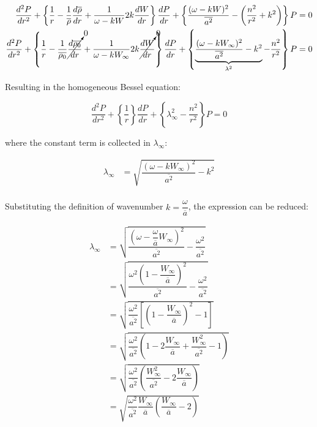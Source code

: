\documentclass[]{aiaa-tc}%
\begin{document}
\begin{align*}
\dfrac{d^2P}{dr^2}
+ \left\{
    \dfrac{1}{r}
    - \dfrac{1}{\overline{\rho}}\frac{d \overline{\rho}}{dr}
    + \dfrac{1}{\omega - kW} 2k \dfrac{dW}{dr}
\right\} \dfrac{dP}{dr}
+ \left\{
    \dfrac{(\omega - kW)^2}{\overline{a^2}}
    - \left( \dfrac{n^2}{r^2} + k^2 \right)
\right\} P = 0 \\
\dfrac{d^2P}{dr^2}
  + \left\{
    \dfrac{1}{r}
    - \dfrac{1}{\overline{\rho_0}} \cancelto{0}{\frac{d \overline{\rho_0}}{dr}}
    + \dfrac{1}{\omega - kW_{\infty}} 2k \cancelto{0}{\dfrac{dW}{dr}}
\right\} \dfrac{dP}{dr}
 + \left\{
    \underbrace{ \dfrac{(\omega - k W_{\infty} )^2}{\overline{a^2} }
    - k^2 }_{\lambda^2}
    - \dfrac{n^2}{r^2}
\right\} P = 0      \\
\end{align*}

Resulting in the homogeneous Bessel equation:

\begin{equation} \label{BesselEqn}
\boxed{ \dfrac{d^2P}{dr^2} + \left\{ \dfrac{1}{r} \right\} \dfrac{dP}{dr}
      + \left\{ \lambda_{\infty}^2 - \dfrac{n^2}{r^2} \right\} P = 0 }
\end{equation}

\noindent where the constant term is collected in $\lambda_{\infty}$:

\begin{align*}
\lambda_{\infty} &= \sqrt{\dfrac{(\omega - k W_{\infty} )^2}{\overline{a^2} } - k^2} \\
\end{align*}

Substituting the definition of wavenumber $k=\dfrac{\omega}{\overline{a}}$, the expression can be reduced:

\begin{align*}
\lambda_{\infty} &= \sqrt{
  \dfrac{ \left(\omega -\dfrac{\omega}{\overline{a}} W_{\infty} \right)^2}{\overline{a^2}}
  - \dfrac{\omega^2}{\overline{a^2}}
  } \\
&= \sqrt{
  \dfrac{ \omega^2 \left(1 -\dfrac{W_{\infty}}{\overline{a}} \right)^2}{\overline{a^2}}
  - \dfrac{\omega^2}{\overline{a^2}}
  } \\
&= \sqrt{ \dfrac{\omega^2}{\overline{a^2}}
    \left[ \left(1 -\dfrac{W_{\infty}}{\overline{a}} \right)^2 - 1  \right]
  } \\
&= \sqrt{ \dfrac{\omega^2}{\overline{a^2}}
    \left( 1 -2\dfrac{W_{\infty}}{\overline{a}} + \dfrac{W_{\infty}^2}{\overline{a^2}} - 1  \right) } \\
&= \sqrt{ \dfrac{\omega^2}{\overline{a^2}}
    \left( \dfrac{W_{\infty}^2}{\overline{a^2}} -2\dfrac{W_{\infty}}{\overline{a}} \right) } \\
&= \sqrt{ \dfrac{\omega^2}{\overline{a^2}} \dfrac{W_{\infty}}{\overline{a}}
    \left( \dfrac{W_{\infty}}{\overline{a}} - 2 \right) } \\
\end{align*}
\end{document}
